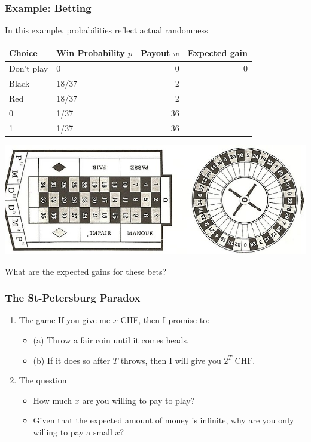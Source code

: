 \documentclass[smaller]{article}
\begin{document}
\subsubsection{Example: Betting}
\label{sec:org7280576}
In this example, probabilities reflect actual randomness

\begin{center}
\begin{tabular}{llrr}
\hline
Choice & Win Probability \(p\) & Payout \(w\) & Expected gain\\
\hline
Don't play & 0 & 0 & 0\\
Black & 18/37 & 2 & \\
Red & 18/37 & 2 & \\
0 & 1/37 & 36 & \\
1 & 1/37 & 36 & \\
\hline
\end{tabular}
\end{center}

\begin{center}
\includegraphics[width=.9\linewidth]{./figures/roulette.jpg}
\end{center}
What are the expected gains for these bets?
\subsubsection{The St-Petersburg Paradox}
\label{sec:orge323c7d}
\begin{enumerate}
\item The game
\label{sec:orgb2aae1f}
If you give me \(x\) CHF, then I promise to:
\begin{itemize}
\item (a) Throw a fair coin until it comes heads.
\item (b) If it does so after \(T\) throws, then I will give you \(2^T\) CHF.
\end{itemize}
\item The question
\label{sec:org240f844}
\begin{itemize}
\item How much \(x\) are you willing to pay to play?
\item Given that the expected amount of money is infinite, why are you only willing to pay a small \(x\)?
\end{itemize}
\end{enumerate}
\end{document}
